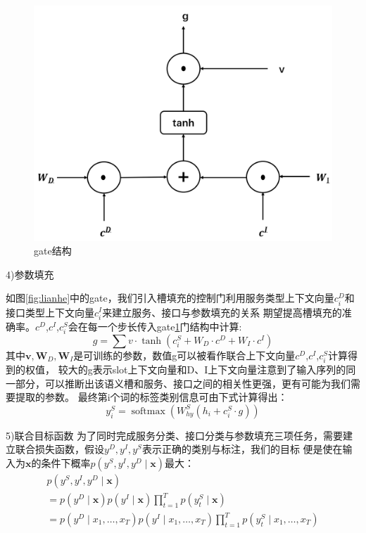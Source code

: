       \begin{figure}[htbp]
        \centering
        \includegraphics[scale=0.5]{./images/gate.jpg}
        \caption{gate结构}
        \label{fig:gate}
      \end{figure}

4)参数填充

如图\ref{fig:lianhe}中的gate，我们引入槽填充的控制门利用服务类型上下文向量${c}_{i}^{D}$和接口类型上下文向量${c}_{i}^{I}$来建立服务、接口与参数填充的关系
期望提高槽填充的准确率。${c}^{D}$,${c}^{I}$,${c}_{i}^{S}$会在每一个步长传入gate\ref{fig:gate}门结构中计算:
\begin{equation}
    g=\sum v \cdot \tanh (c_{i}^{S}+W_D \cdot c^{D}+W_I \cdot c^{I})
  \end{equation}
其中$\mathbf{v},\mathbf{W}_D,\mathbf{W}_I$是可训练的参数，数值g可以被看作联合上下文向量${c}^{D}$,${c}^{I}$,${c}_{i}^{S}$计算得到的权值，
较大的g表示slot上下文向量和D、I上下文向量注意到了输入序列的同一部分，可以推断出该语义槽和服务、接口之间的相关性更强，更有可能为我们需要提取的参数。
最终第i个词的标签类别信息可由下式计算得出：
\begin{equation}
    y_{i}^{S}=\operatorname{softmax}\left(W_{h y}^{S}\left(h_{i}+c_{i}^{S} \cdot g\right)\right)
  \end{equation}

5)联合目标函数
为了同时完成服务分类、接口分类与参数填充三项任务，需要建立联合损失函数，假设$y^D,y^I,y^S$表示正确的类别与标注，我们的目标
便是使在输入为$\mathbf{x}$的条件下概率$p\left(y^{S}, y^{I},y^{D} \mid \mathbf{x}\right)$最大：
\begin{equation}
    \begin{array}{l}
        p\left(y^{S}, y^{I},y^{D} \mid \mathbf{x}\right) \\
        =p\left(y^{D} \mid \mathbf{x}\right) p\left(y^{I} \mid \mathbf{x}\right) \prod_{t=1}^{T} p\left(y_{t}^{S} \mid \mathbf{x}\right) \\
        =p(y^{D} \mid x_{1}, \ldots, x_{T}) p(y^{I} \mid x_{1}, \ldots, x_{T}) \prod_{t=1}^{T} p(y_{t}^{S} \mid x_{1}, \ldots, x_{T})
        \end{array}
    \end{equation}

